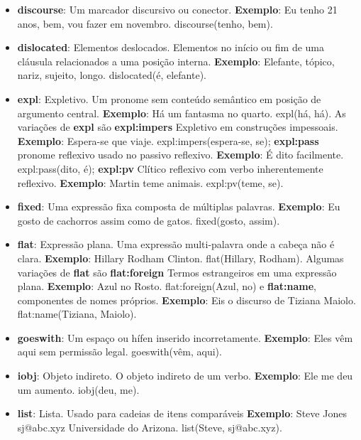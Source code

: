 \begin{itemize}
\item\textbf{discourse}: Um marcador discursivo ou conector. \textbf{Exemplo}: Eu tenho 21 anos, bem, vou fazer em novembro. discourse(tenho, bem).

\item\textbf{dislocated}: Elementos deslocados. Elementos no início ou fim de uma cláusula relacionados a uma posição interna. \textbf{Exemplo}: Elefante, tópico, nariz, sujeito, longo. dislocated(é, elefante).

\item\textbf{expl}: Expletivo. Um pronome sem conteúdo semântico em posição de argumento central. \textbf{Exemplo}: Há um fantasma no quarto. expl(há, há). As variações de \textbf{expl} são \textbf{expl:impers} Expletivo em construções impessoais. \textbf{Exemplo}: Espera-se que viaje. expl:impers(espera-se, se); \textbf{expl:pass} pronome reflexivo usado no passivo reflexivo. \textbf{Exemplo}: É dito facilmente. expl:pass(dito, é); \textbf{expl:pv} Clítico reflexivo com verbo inherentemente reflexivo. \textbf{Exemplo}: Martin teme animais. expl:pv(teme, se).

\item\textbf{fixed}: Uma expressão fixa composta de múltiplas palavras. \textbf{Exemplo}: Eu gosto de cachorros assim como de gatos. fixed(gosto, assim).

\item\textbf{flat}: Expressão plana. Uma expressão multi-palavra onde a cabeça não é clara. \textbf{Exemplo}: Hillary Rodham Clinton. flat(Hillary, Rodham). Algumas variações de \textbf{flat} são \textbf{flat:foreign} Termos estrangeiros em uma expressão plana. \textbf{Exemplo}: Azul no Rosto. flat:foreign(Azul, no) e \textbf{flat:name}, componentes de nomes próprios. \textbf{Exemplo}: Eis o discurso de Tiziana Maiolo. flat:name(Tiziana, Maiolo).

\item\textbf{goeswith}: Um espaço ou hífen inserido incorretamente. \textbf{Exemplo}: Eles vêm aqui sem permissão legal. goeswith(vêm, aqui).

\item\textbf{iobj}: Objeto indireto. O objeto indireto de um verbo. \textbf{Exemplo}: Ele me deu um aumento. iobj(deu, me).

\item\textbf{list}: Lista. Usado para cadeias de itens comparáveis \textbf{Exemplo}: Steve Jones sj@abc.xyz Universidade do Arizona. list(Steve, sj@abc.xyz).


\end{itemize}
